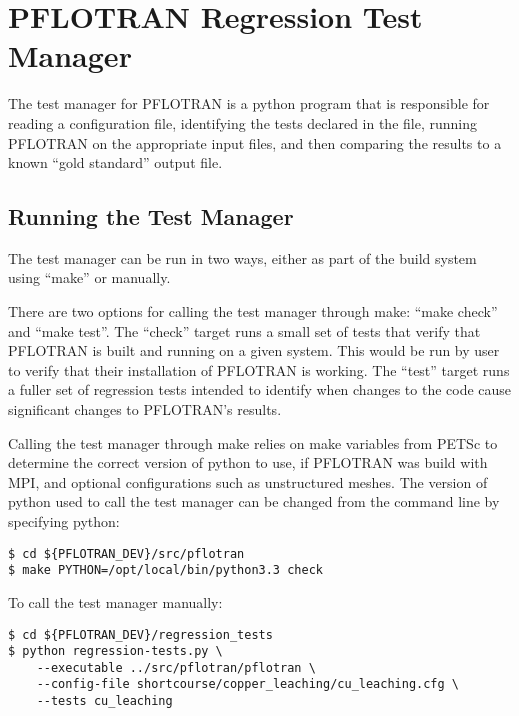 \section{PFLOTRAN Regression Test Manager}

The test manager for PFLOTRAN is a python program that is responsible
for reading a configuration file, identifying the tests declared in
the file, running PFLOTRAN on the appropriate input files, and then
comparing the results to a known ``gold standard'' output file.

\subsection{Running the Test Manager}
The test manager can be run in two ways, either as part of the build
system using ``make'' or manually.

There are two options for calling the test manager through make:
``make check'' and ``make test''. The ``check'' target runs a small
set of tests that verify that PFLOTRAN is built and running on a given
system. This would be run by user to verify that their installation of
PFLOTRAN is working. The ``test'' target runs a fuller set of
regression tests intended to identify when changes to the code cause
significant changes to PFLOTRAN's results.

Calling the test manager through make relies on make variables from
PETSc to determine the correct version of python to use, if PFLOTRAN
was build with MPI, and optional configurations such as unstructured
meshes. The version of python used to call the test manager can be
changed from the command line by specifying python:

\begin{verbatim}
$ cd ${PFLOTRAN_DEV}/src/pflotran
$ make PYTHON=/opt/local/bin/python3.3 check
\end{verbatim}

To call the test manager manually:
\begin{verbatim}
$ cd ${PFLOTRAN_DEV}/regression_tests
$ python regression-tests.py \
    --executable ../src/pflotran/pflotran \
    --config-file shortcourse/copper_leaching/cu_leaching.cfg \
    --tests cu_leaching
\end{verbatim}

